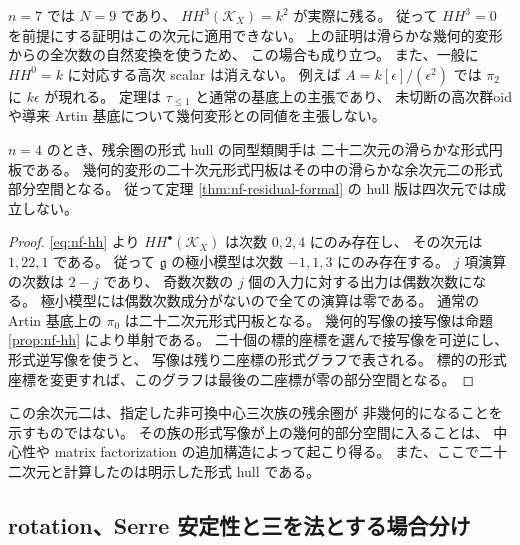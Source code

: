 \begin{remark}[七次元と高次自己同型]
\label{rem:nf-seven}
$n=7$ では $N=9$ であり、
$HH^3(\mathcal K_X)=k^2$ が実際に残る。
従って $HH^3=0$ を前提にする証明はこの次元に適用できない。
上の証明は滑らかな幾何的変形からの全次数の自然変換を使うため、
この場合も成り立つ。
また、一般に $HH^0=k$ に対応する高次 scalar は消えない。
例えば $A=k[\epsilon]/(\epsilon^2)$ では
$\pi_2$ に $k\epsilon$ が現れる。
定理は $\tau_{\leq1}$ と通常の基底上の主張であり、
未切断の高次群oidや導来 Artin 基底について幾何変形との同値を主張しない。
\end{remark}

\begin{proposition}[四次元の形式的障害]
\label{prop:nf-fourfold-obstruction}
$n=4$ のとき、残余圏の形式 hull の同型類関手は
二十二次元の滑らかな形式円板である。
幾何的変形の二十次元形式円板はその中の滑らかな余次元二の形式部分空間となる。
従って定理 \ref{thm:nf-residual-formal} の hull 版は四次元では成立しない。
\end{proposition}

\begin{proof}
\eqref{eq:nf-hh} より $HH^\bullet(\mathcal K_X)$ は次数 $0,2,4$ にのみ存在し、
その次元は $1,22,1$ である。
従って $\mathfrak g$ の極小模型は次数 $-1,1,3$ にのみ存在する。
$j$ 項演算の次数は $2-j$ であり、
奇数次数の $j$ 個の入力に対する出力は偶数次数になる。
極小模型には偶数次数成分がないので全ての演算は零である。
通常の Artin 基底上の $\pi_0$ は二十二次元形式円板となる。
幾何的写像の接写像は命題 \ref{prop:nf-hh} により単射である。
二十個の標的座標を選んで接写像を可逆にし、形式逆写像を使うと、
写像は残り二座標の形式グラフで表される。
標的の形式座標を変更すれば、このグラフは最後の二座標が零の部分空間となる。
\end{proof}

この余次元二は、指定した非可換中心三次族の残余圏が
非幾何的になることを示すものではない。
その族の形式写像が上の幾何的部分空間に入ることは、
中心性や matrix factorization の追加構造によって起こり得る。
また、ここで二十二次元と計算したのは明示した形式 hull である。

\subsection{rotation、Serre 安定性と三を法とする場合分け}

